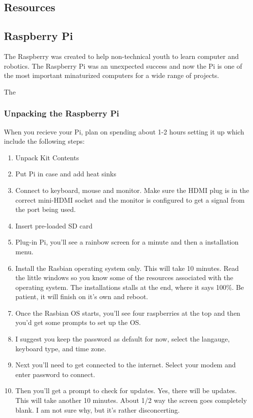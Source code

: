 \documentclass{article}\usepackage[]{graphicx}\usepackage[]{color}
\begin{document}
\subsection{Resources}

\subsection{Raspberry Pi}

The Raspberry was created to help non-technical youth to learn computer and robotics. The Raspberry Pi was an unexpected success and now the Pi is one of the most important minaturized computers for a wide range of projects.  

The %

\subsubsection{Unpacking the Raspberry Pi}

When you recieve your Pi, plan on spending about 1-2 hours setting it up which include the following steps:

\begin{enumerate}

\item Unpack Kit Contents
\item Put Pi in case and add heat sinks
\item Connect to keyboard, mouse and monitor. Make sure the HDMI plug is in the correct mini-HDMI socket and the monitor is configured to get a signal from the port being used. 
\item Insert pre-loaded SD card
\item Plug-in Pi, you'll see a rainbow screen for a minute and then a installation menu. 
\item Install the Rasbian operating system only. This will take 10 minutes. Read the little windows so you know some of the resources associated with the operating system. The installations stalls at the end, where it says 100\%. Be patient, it will finish on it's own and reboot. 
\item Once the Rasbian OS starts, you'll see four raspberries at the top and then you'd get some prompts to set up the OS. 
\item I suggest you keep the password as default for now, select the langauge, keyboard type, and time zone. 
\item Next you'll need to get connected to the internet. Select your modem and enter password to connect.
\item Then you'll get a prompt to check for updates. Yes, there will be updates. This will take another 10 minutes. About 1/2 way the screen goes completely blank. I am not sure why, but it's rather disconcerting. 

\end{enumerate}
\end{document}
